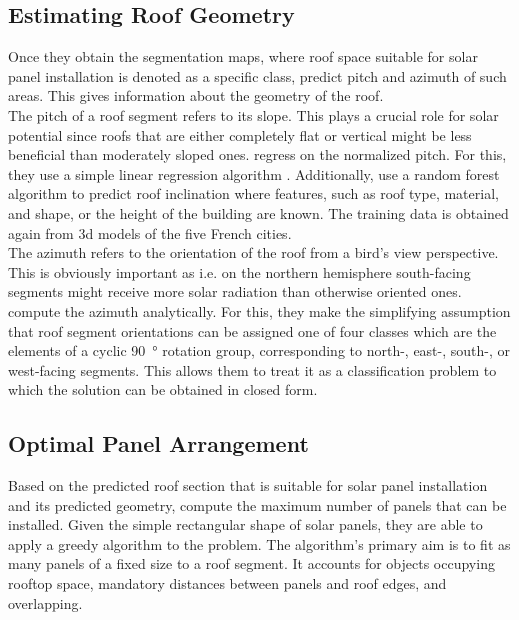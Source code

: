 \documentclass{article} %
\begin{document}
\subsection*{Estimating Roof Geometry}
Once they obtain the segmentation maps, where roof space suitable for solar panel installation is denoted as a specific class, \citet{de2021predicting} predict pitch and azimuth of such areas. This gives information about the geometry of the roof.\\
The pitch of a roof segment refers to its slope. This plays a crucial role for solar potential since roofs that are either completely flat or vertical might be less beneficial than moderately sloped ones. \citet{de2021predicting} regress on the normalized pitch. For this, they use a simple linear regression algorithm \cite{gross2003linear}. Additionally,\citet{de2021predicting} use a random forest algorithm \cite{belgiu2016random} to predict roof inclination where features, such as roof type, material, and shape, or the height of the building are known. The training data is obtained again from 3d models of the five French cities.\\
The azimuth refers to the orientation of the roof from a bird's view perspective. This is obviously important as i.e. on the northern hemisphere south-facing segments might receive more solar radiation than otherwise oriented ones.\\ \citet{de2021predicting} compute the azimuth analytically. For this, they make the simplifying assumption that roof segment orientations can be assigned one of four classes which are the elements of a cyclic \SI{90}{\degree} rotation group, corresponding to north-, east-, south-, or west-facing segments. This allows them to treat it as a classification problem to which the solution can be obtained in closed form.

\subsection*{Optimal Panel Arrangement}
Based on the predicted roof section that is suitable for solar panel installation and its predicted geometry, \citet{de2021predicting} compute the maximum number of panels that can be installed. Given the simple rectangular shape of solar panels, they are able to apply a greedy algorithm to the problem. The algorithm's primary aim is to fit as many panels of a fixed size to a roof segment. It accounts for objects occupying rooftop space, mandatory distances between panels and roof edges, and overlapping.
\end{document}
